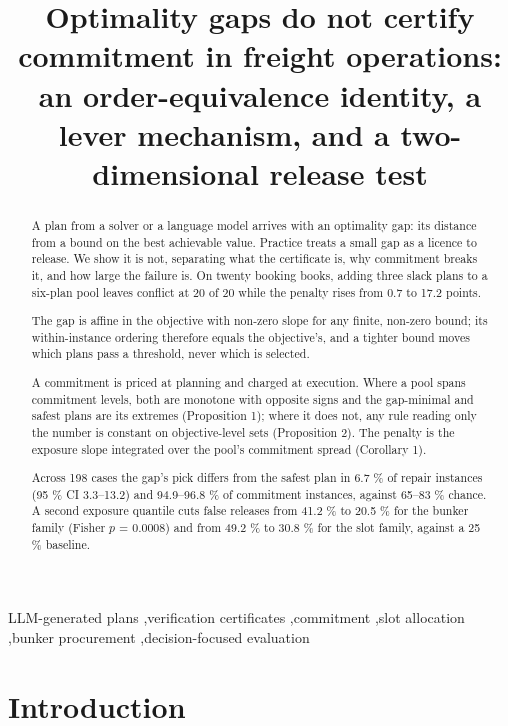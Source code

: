 \documentclass[preprint,12pt,letterpaper]{elsarticle}
\theoremstyle{definition}
\theoremstyle{plain}
\begin{document}
\begin{frontmatter}

\title{Optimality gaps do not certify commitment in freight operations: an order-equivalence identity, a lever mechanism, and a two-dimensional release test}

\begin{abstract}
\setlength{\parindent}{0pt}\setlength{\parskip}{0.45ex}
A plan from a solver or a language model arrives with an optimality gap: its distance from a bound on the best achievable value. Practice treats a small gap as a licence to release. We show it is not, separating what the certificate is, why commitment breaks it, and how large the failure is. On twenty booking books, adding three slack plans to a six-plan pool leaves conflict at 20 of 20 while the penalty rises from 0.7 to 17.2 points.

The gap is affine in the objective with non-zero slope for any finite, non-zero bound; its within-instance ordering therefore equals the objective's, and a tighter bound moves which plans pass a threshold, never which is selected.

A commitment is priced at planning and charged at execution. Where a pool spans commitment levels, both are monotone with opposite signs and the gap-minimal and safest plans are its extremes (Proposition 1); where it does not, any rule reading only the number is constant on objective-level sets (Proposition 2). The penalty is the exposure slope integrated over the pool's commitment spread (Corollary 1).

Across 198 cases the gap's pick differs from the safest plan in 6.7 \% of repair instances (95 \% CI 3.3--13.2) and 94.9--96.8 \% of commitment instances, against 65--83 \% chance. A second exposure quantile cuts false releases from 41.2 \% to 20.5 \% for the bunker family (Fisher $p$ = 0.0008) and from 49.2 \% to 30.8 \% for the slot family, against a 25 \% baseline.
\end{abstract}

\begin{keyword}
LLM-generated plans \sep verification certificates \sep commitment \sep slot allocation \sep bunker procurement \sep decision-focused evaluation
\end{keyword}

\end{frontmatter}

\section{Introduction}
\end{document}
